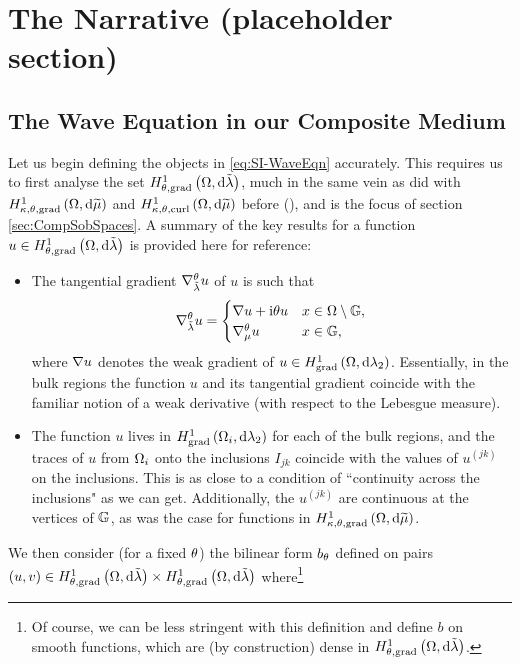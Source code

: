 \section{The Narrative (placeholder section)}

\subsection{The Wave Equation in our Composite Medium} \label{ssec:SI-WaveEqnSetup}
Let us begin defining the objects in \eqref{eq:SI-WaveEqn} accurately.
This requires us to first analyse the set $H^1_{\theta, \mathrm{grad}}\left( \Omega, \mathrm{d}\tilde{\lambda} \right)$, much in the same vein as did with $H^1_{\kappa,\theta,\mathrm{grad}}\left( \Omega, \mathrm{d}\widetilde{\mu} \right)$ and $H^1_{\kappa,\theta,\mathrm{curl}}\left( \Omega, \mathrm{d}\widetilde{\mu} \right)$ before (), and is the focus of section \ref{sec:CompSobSpaces}.
A summary of the key results for a function $u\in H^1_{\theta, \mathrm{grad}}\left( \Omega, \mathrm{d}\tilde{\lambda} \right)$ is provided here for reference:
\begin{itemize}
	\item The tangential gradient $\nabla^{\theta}_{\tilde{\lambda}}u$ of $u$ is such that
	\begin{align*}
		\nabla^{\theta}_{\tilde{\lambda}}u = \begin{cases} \nabla u + \mathrm{i}\theta u & x\in\Omega\setminus\mathbb{G}, \\ \nabla^{\theta}_{\mu}u & x\in\mathbb{G}, \end{cases}
	\end{align*}
	where $\nabla u$ denotes the weak gradient of $u\in H^1_\mathrm{grad}\left( \Omega, \mathrm{d}\lambda_2 \right)$.
	Essentially, in the bulk regions the function $u$ and its tangential gradient coincide with the familiar notion of a weak derivative (with respect to the Lebesgue measure).
	\item The function $u$ lives in $H^1_\mathrm{grad}\left( \Omega_i, \mathrm{d}\lambda_2 \right)$ for each of the bulk regions, and the traces of $u$ from $\Omega_i$ onto the inclusions $I_{jk}$ coincide with the values of $u^{(jk)}$ on the inclusions.
	This is as close to a condition of ``continuity across the inclusions" as we can get.
	Additionally, the $u^{(jk)}$ are continuous at the vertices of $\mathbb{G}$, as was the case for functions in $H^1_{\kappa,\theta,\mathrm{grad}}\left( \Omega, \mathrm{d}\widetilde{\mu} \right)$.
\end{itemize}
We then consider (for a fixed $\theta$) the bilinear form $b_{\theta}$ defined on pairs $(u,v)\in H^1_{\theta, \mathrm{grad}}\left( \Omega, \mathrm{d}\tilde{\lambda} \right)\times H^1_{\theta, \mathrm{grad}}\left( \Omega, \mathrm{d}\tilde{\lambda} \right)$ where\footnote{Of course, we can be less stringent with this definition and define $b$ on smooth functions, which are (by construction) dense in $H^1_{\theta, \mathrm{grad}}\left( \Omega, \mathrm{d}\tilde{\lambda} \right)$.}
